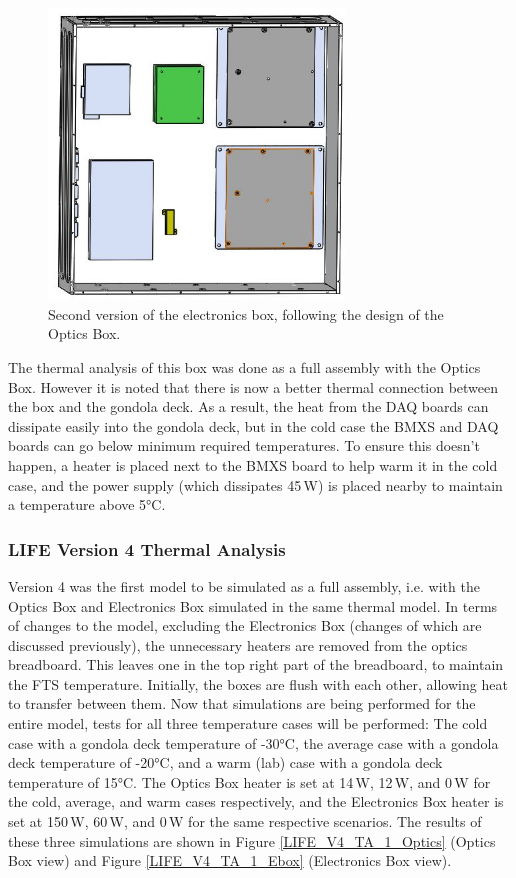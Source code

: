 \begin{figure}
    \centering
    \includegraphics[width=0.7\textwidth]{chap3_images/LIFE_V4_images/Ebox_V2.JPG}
    \caption{Second version of the electronics box, following the design of the Optics Box.}
    \label{fig:EBOX_V2}
\end{figure}

The thermal analysis of this box was done as a full assembly with the Optics Box. However it is noted that there is now a better thermal connection between the box and the gondola deck. As a result, the heat from the DAQ boards can dissipate easily into the gondola deck, but in the cold case the BMXS and DAQ boards can go below minimum required temperatures. To ensure this doesn't happen, a heater is placed next to the BMXS board to help warm it in the cold case, and the power supply (which dissipates 45\,W) is placed nearby to maintain a temperature above 5°C.

\subsubsection{LIFE Version 4 Thermal Analysis}
Version 4 was the first model to be simulated as a full assembly, i.e. with the Optics Box and Electronics Box simulated in the same thermal model. In terms of changes to the model, excluding the Electronics Box (changes of which are discussed previously), the unnecessary heaters are removed from the optics breadboard. This leaves one in the top right part of the breadboard, to maintain the FTS temperature. Initially, the boxes are flush with each other, allowing heat to transfer between them. Now that simulations are being performed for the entire model, tests for all three temperature cases will be performed: The cold case with a gondola deck temperature of -30°C, the average case with a gondola deck temperature of -20°C, and a warm (lab) case with a gondola deck temperature of 15°C. The Optics Box heater is set at 14\,W, 12\,W, and 0\,W for the cold, average, and warm cases respectively, and the Electronics Box heater is set at 150\,W, 60\,W, and 0\,W for the same respective scenarios. The results of these three simulations are shown in Figure \ref{LIFE_V4_TA_1_Optics} (Optics Box view) and Figure \ref{LIFE_V4_TA_1_Ebox} (Electronics Box view).


